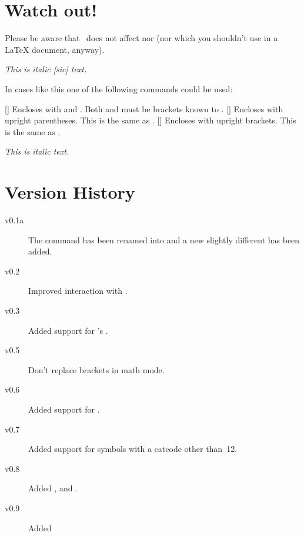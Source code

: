 \documentclass[load-preamble+]{cnltx-doc}
\begin{document}
\section{Watch out!}
Please be aware that \embrac\ does not affect  nor  (nor
 which you shouldn't use in a \LaTeX{} document, anyway).
\begin{example}
  \itshape This is italic [sic] text.
\end{example}
In cases like this one of the following commands could be used:
\begin{commands}
  []
    Encloses  with  and . Both
     and  must be brackets known to \embrac.
  []
    Encloses  with upright parentheses.  This is
    the same as \Marg{(}\Marg{)}.
  []
    Encloses  with upright brackets.  This is
    the same as \Marg{[}\Marg{]}.
\end{commands}
\begin{example}
  \itshape This is italic  text.
\end{example}

\section{Version History}
\begin{description}
  \item[v0.1a] The command  has been renamed into
     and a new slightly different  has been added.
  \item[v0.2] Improved interaction with .
  \item[v0.3] Added support for 's .
  \item[v0.5] Don't replace brackets in math mode.
  \item[v0.6] Added support for .
  \item[v0.7] Added support for symbols with a catcode other than~12.
  \item[v0.8] Added ,  and .
  \item[v0.9] Added 
\end{description}
\end{document}
